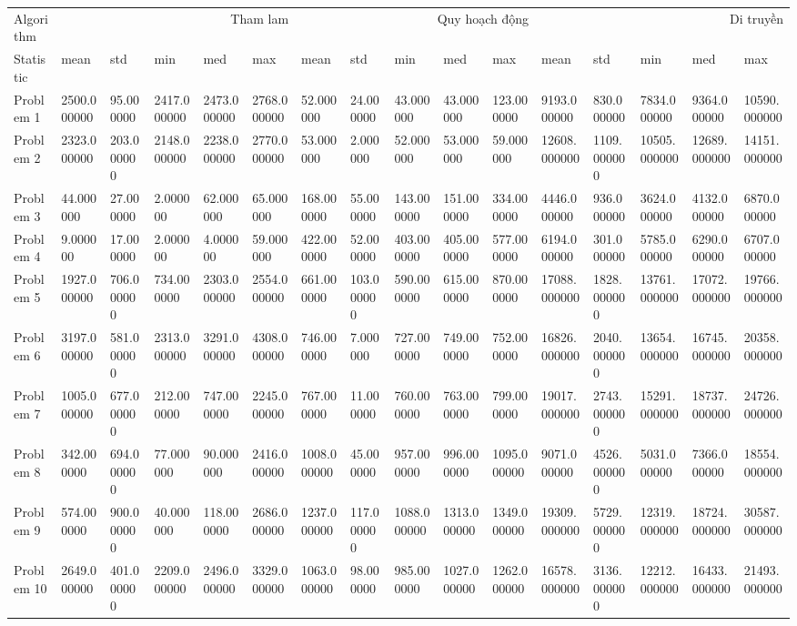 \begin{tabular}{llllllllllllllll}
\toprule
Algorithm & \multicolumn{5}{r}{Tham lam} & \multicolumn{5}{r}{Quy hoạch động} & \multicolumn{5}{r}{Di truyền} \\
Statistic & mean & std & min & med & max & mean & std & min & med & max & mean & std & min & med & max \\
\midrule
Problem 1 & 2500.000000 & 95.000000 & 2417.000000 & 2473.000000 & 2768.000000 & 52.000000 & 24.000000 & 43.000000 & 43.000000 & 123.000000 & 9193.000000 & 830.000000 & 7834.000000 & 9364.000000 & 10590.000000 \\
Problem 2 & 2323.000000 & 203.000000 & 2148.000000 & 2238.000000 & 2770.000000 & 53.000000 & 2.000000 & 52.000000 & 53.000000 & 59.000000 & 12608.000000 & 1109.000000 & 10505.000000 & 12689.000000 & 14151.000000 \\
Problem 3 & 44.000000 & 27.000000 & 2.000000 & 62.000000 & 65.000000 & 168.000000 & 55.000000 & 143.000000 & 151.000000 & 334.000000 & 4446.000000 & 936.000000 & 3624.000000 & 4132.000000 & 6870.000000 \\
Problem 4 & 9.000000 & 17.000000 & 2.000000 & 4.000000 & 59.000000 & 422.000000 & 52.000000 & 403.000000 & 405.000000 & 577.000000 & 6194.000000 & 301.000000 & 5785.000000 & 6290.000000 & 6707.000000 \\
Problem 5 & 1927.000000 & 706.000000 & 734.000000 & 2303.000000 & 2554.000000 & 661.000000 & 103.000000 & 590.000000 & 615.000000 & 870.000000 & 17088.000000 & 1828.000000 & 13761.000000 & 17072.000000 & 19766.000000 \\
Problem 6 & 3197.000000 & 581.000000 & 2313.000000 & 3291.000000 & 4308.000000 & 746.000000 & 7.000000 & 727.000000 & 749.000000 & 752.000000 & 16826.000000 & 2040.000000 & 13654.000000 & 16745.000000 & 20358.000000 \\
Problem 7 & 1005.000000 & 677.000000 & 212.000000 & 747.000000 & 2245.000000 & 767.000000 & 11.000000 & 760.000000 & 763.000000 & 799.000000 & 19017.000000 & 2743.000000 & 15291.000000 & 18737.000000 & 24726.000000 \\
Problem 8 & 342.000000 & 694.000000 & 77.000000 & 90.000000 & 2416.000000 & 1008.000000 & 45.000000 & 957.000000 & 996.000000 & 1095.000000 & 9071.000000 & 4526.000000 & 5031.000000 & 7366.000000 & 18554.000000 \\
Problem 9 & 574.000000 & 900.000000 & 40.000000 & 118.000000 & 2686.000000 & 1237.000000 & 117.000000 & 1088.000000 & 1313.000000 & 1349.000000 & 19309.000000 & 5729.000000 & 12319.000000 & 18724.000000 & 30587.000000 \\
Problem 10 & 2649.000000 & 401.000000 & 2209.000000 & 2496.000000 & 3329.000000 & 1063.000000 & 98.000000 & 985.000000 & 1027.000000 & 1262.000000 & 16578.000000 & 3136.000000 & 12212.000000 & 16433.000000 & 21493.000000 \\
\bottomrule
\end{tabular}
